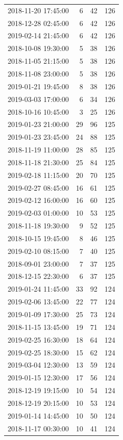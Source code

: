 \begin{tabular}{lrrr}
2018-11-20 17:45:00 & 6 & 42 & 126 \\
2018-12-28 02:45:00 & 6 & 42 & 126 \\
2019-02-14 21:45:00 & 6 & 42 & 126 \\
2018-10-08 19:30:00 & 5 & 38 & 126 \\
2018-11-05 21:15:00 & 5 & 38 & 126 \\
2018-11-08 23:00:00 & 5 & 38 & 126 \\
2019-01-21 19:45:00 & 8 & 38 & 126 \\
2019-03-03 17:00:00 & 6 & 34 & 126 \\
2018-10-16 10:45:00 & 3 & 25 & 126 \\
2019-01-23 21:00:00 & 29 & 96 & 125 \\
2019-01-23 23:45:00 & 24 & 88 & 125 \\
2018-11-19 11:00:00 & 28 & 85 & 125 \\
2018-11-18 21:30:00 & 25 & 84 & 125 \\
2019-02-18 11:15:00 & 20 & 70 & 125 \\
2019-02-27 08:45:00 & 16 & 61 & 125 \\
2019-02-12 16:00:00 & 16 & 60 & 125 \\
2019-02-03 01:00:00 & 10 & 53 & 125 \\
2018-11-18 19:30:00 & 9 & 52 & 125 \\
2018-10-15 19:45:00 & 8 & 46 & 125 \\
2019-02-10 08:15:00 & 7 & 40 & 125 \\
2018-09-01 23:00:00 & 7 & 37 & 125 \\
2018-12-15 22:30:00 & 6 & 37 & 125 \\
2019-01-24 11:45:00 & 33 & 92 & 124 \\
2019-02-06 13:45:00 & 22 & 77 & 124 \\
2019-01-09 17:30:00 & 25 & 73 & 124 \\
2018-11-15 13:45:00 & 19 & 71 & 124 \\
2019-02-25 16:30:00 & 18 & 64 & 124 \\
2019-02-25 18:30:00 & 15 & 62 & 124 \\
2019-03-04 12:30:00 & 13 & 59 & 124 \\
2019-01-15 12:30:00 & 17 & 56 & 124 \\
2018-12-19 19:15:00 & 10 & 54 & 124 \\
2018-12-19 20:15:00 & 10 & 53 & 124 \\
2019-01-14 14:45:00 & 10 & 50 & 124 \\
2018-11-17 00:30:00 & 10 & 41 & 124 \\

\end{tabular}
